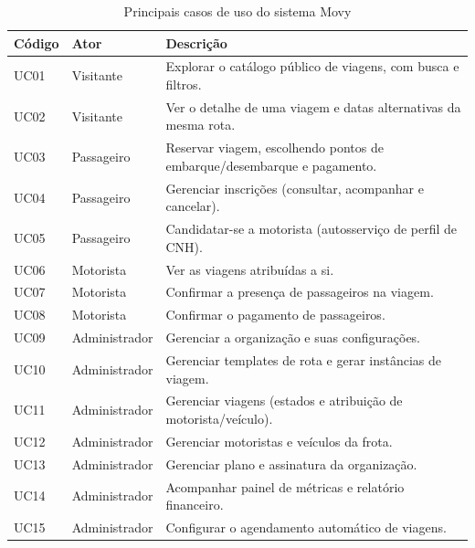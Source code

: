 \begin{table}[H]
\centering
\caption{Principais casos de uso do sistema Movy}
\label{tab:casos_uso}
\renewcommand{\arraystretch}{1.2}
\begin{tabularx}{\textwidth}{l l X}
\toprule
\textbf{Código} & \textbf{Ator} & \textbf{Descrição} \\
\midrule
UC01 & Visitante      & Explorar o catálogo público de viagens, com busca e filtros. \\
UC02 & Visitante      & Ver o detalhe de uma viagem e datas alternativas da mesma rota. \\
UC03 & Passageiro     & Reservar viagem, escolhendo pontos de embarque/desembarque e pagamento. \\
UC04 & Passageiro     & Gerenciar inscrições (consultar, acompanhar e cancelar). \\
UC05 & Passageiro     & Candidatar-se a motorista (autosserviço de perfil de CNH). \\
UC06 & Motorista      & Ver as viagens atribuídas a si. \\
UC07 & Motorista      & Confirmar a presença de passageiros na viagem. \\
UC08 & Motorista      & Confirmar o pagamento de passageiros. \\
UC09 & Administrador  & Gerenciar a organização e suas configurações. \\
UC10 & Administrador  & Gerenciar templates de rota e gerar instâncias de viagem. \\
UC11 & Administrador  & Gerenciar viagens (estados e atribuição de motorista/veículo). \\
UC12 & Administrador  & Gerenciar motoristas e veículos da frota. \\
UC13 & Administrador  & Gerenciar plano e assinatura da organização. \\
UC14 & Administrador  & Acompanhar painel de métricas e relatório financeiro. \\
UC15 & Administrador  & Configurar o agendamento automático de viagens. \\
\bottomrule
\end{tabularx}
\end{table}
